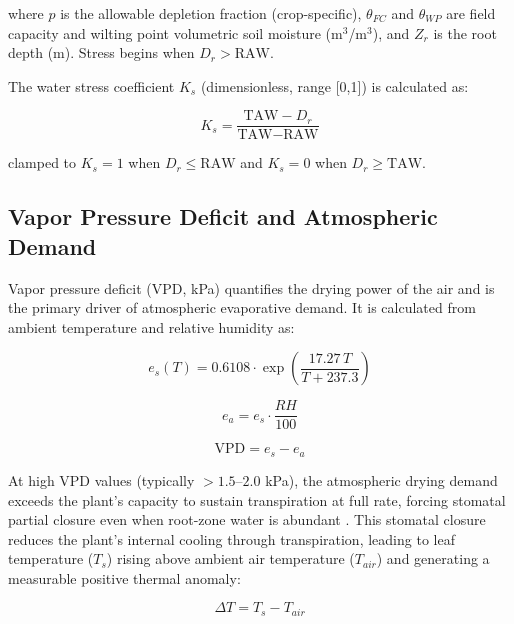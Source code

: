 \documentclass[review,12pt]{elsarticle}
\begin{document}
\noindent where $p$ is the allowable depletion fraction (crop-specific), $\theta_{FC}$ and $\theta_{WP}$ are field capacity and wilting point volumetric soil moisture (m$^3$/m$^3$), and $Z_r$ is the root depth (m). Stress begins when $D_r > \text{RAW}$.

The water stress coefficient $K_s$ (dimensionless, range [0,1]) is calculated as:

\begin{equation}
K_s = \frac{\text{TAW} - D_r}{\text{TAW} - \text{RAW}}
\label{eq:ks}
\end{equation}

\noindent clamped to $K_s = 1$ when $D_r \leq \text{RAW}$ and $K_s = 0$ when $D_r \geq \text{TAW}$.

\subsection{Vapor Pressure Deficit and Atmospheric Demand}
\label{subsec:vpd}

Vapor pressure deficit (VPD, kPa) quantifies the drying power of the air and is the primary driver of atmospheric evaporative demand. It is calculated from ambient temperature and relative humidity as:

\begin{equation}
e_s(T) = 0.6108 \cdot \exp\!\left(\frac{17.27\,T}{T + 237.3}\right)
\label{eq:sat_vp}
\end{equation}

\begin{equation}
e_a = e_s \cdot \frac{RH}{100}
\label{eq:actual_vp}
\end{equation}

\begin{equation}
\text{VPD} = e_s - e_a
\label{eq:vpd}
\end{equation}

At high VPD values (typically $> 1.5$--$2.0$ kPa), the atmospheric drying demand exceeds the plant's capacity to sustain transpiration at full rate, forcing stomatal partial closure even when root-zone water is abundant \citep{saliendra1995influence, katul2012evapotranspiration}. This stomatal closure reduces the plant's internal cooling through transpiration, leading to leaf temperature ($T_s$) rising above ambient air temperature ($T_{air}$) and generating a measurable positive thermal anomaly:

\begin{equation}
\Delta T = T_s - T_{air}
\label{eq:delta_t}
\end{equation}
\end{document}
